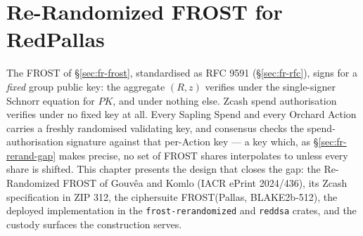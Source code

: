 \documentclass[11pt,a4paper]{article}
\theoremstyle{definition}
\begin{document}

\section{Re-Randomized FROST for RedPallas}\label{sec:fr-rerand}

The FROST of \S\ref{sec:fr-frost}, standardised as RFC 9591
(\S\ref{sec:fr-rfc}), signs for a \emph{fixed} group public key: the
aggregate $(R, z)$ verifies under the single-signer Schnorr equation for
$PK$, and under nothing else. Zcash spend authorisation verifies under no
fixed key at all. Every Sapling Spend and every Orchard Action carries a
freshly randomised validating key, and consensus checks the
spend-authorisation signature against that per-Action key --- a key which,
as \S\ref{sec:fr-rerand-gap} makes precise, no set of FROST shares
interpolates to unless every share is shifted. This chapter presents the
design that closes the gap: the Re-Randomized FROST of Gouv\^ea and Komlo
(IACR ePrint 2024/436), its Zcash specification in ZIP 312, the
ciphersuite FROST(Pallas, BLAKE2b-512), the deployed implementation in the
\texttt{frost-rerandomized} and \texttt{reddsa} crates, and the custody
surfaces the construction serves.
\end{document}
